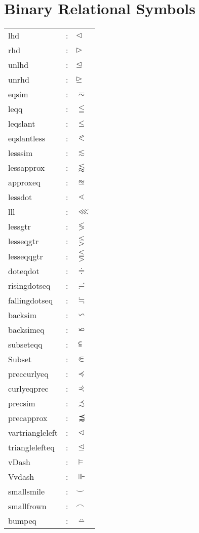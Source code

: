 \documentclass{article}
\begin{document}
\section{Binary Relational Symbols}
\begin{tabular}{lll} 
lhd & : & $\lhd$\\
rhd & : & $\rhd$\\
unlhd & : & $\unlhd$\\
unrhd & : & $\unrhd$\\
eqsim & : & $\eqsim$\\
leqq & : & $\leqq$\\
leqslant & : & $\leqslant$\\                    %
eqslantless & : & $\eqslantless$\\ 
lesssim & : & $\lesssim$\\
lessapprox & : & $\lessapprox$\\
approxeq & : & $\approxeq$\\
lessdot & : & $\lessdot$\\
lll & : & $\lll$\\
lessgtr & : & $\lessgtr$\\
lesseqgtr & : & $\lesseqgtr$\\
lesseqqgtr & : & $\lesseqqgtr$\\
doteqdot & : & $\doteqdot$\\
risingdotseq & : & $\risingdotseq$\\
fallingdotseq & : & $\fallingdotseq$\\
backsim & : & $\backsim$\\
backsimeq & : & $\backsimeq$\\
subseteqq & : & $\subseteqq$\\
Subset & : & $\Subset$\\ 
preccurlyeq & : & $\preccurlyeq$\\
curlyeqprec & : & $\curlyeqprec$\\
precsim & : & $\precsim$\\
precapprox & : & $\precapprox$\\
vartriangleleft & : & $\vartriangleleft$\\
trianglelefteq & : & $\trianglelefteq$\\
vDash & : & $\vDash$\\
Vvdash & : & $\Vvdash$\\
smallsmile & : & $\smallsmile$\\
smallfrown & : & $\smallfrown$\\
bumpeq & : & $\bumpeq$\\

\end{tabular}
\end{document}
